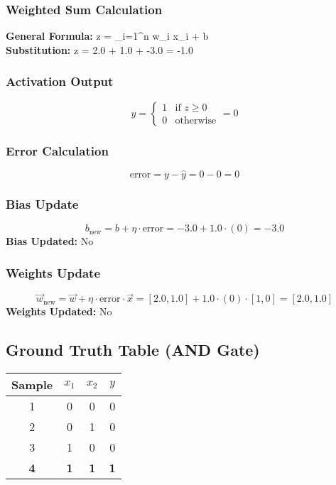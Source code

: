 \documentclass{article}
\begin{document}
\subsubsection*{Weighted Sum Calculation}
\textbf{General Formula:} \quad
z = \sum_{i=1}^{n} w_i x_i + b
\\
\textbf{Substitution:} \quad
z = 2.0  + 1.0  + -3.0 = -1.0

\subsubsection*{Activation Output}
\[
\hat{y} =
\begin{cases}
1 & \text{if } z \geq 0 \\
0 & \text{otherwise}
\end{cases}
= 0
\]

\subsubsection*{Error Calculation}
\[
\text{error} = y - \hat{y} = 0 - 0 = 0
\]

\subsubsection*{Bias Update}
\[
b_{\text{new}} = b + \eta \cdot \text{error} = -3.0 + 1.0 \cdot (0) = -3.0
\]
\textbf{Bias Updated:} No

\subsubsection*{Weights Update}
\[
\vec{w}_{\text{new}} = \vec{w} + \eta \cdot \text{error} \cdot \vec{x} = 
[2.0, 1.0] + 1.0 \cdot (0) \cdot [1, 0] = 
[2.0, 1.0]
\]
\textbf{Weights Updated:} No

\subsection*{Ground Truth Table (AND Gate)}
\begin{center}
\begin{tabular}{|c|c|c|c|}
\hline
\textbf{Sample} & $x_1$ & $x_2$ & $y$ \\
\hline
1 & 0 & 0 & 0 \\
\hline
2 & 0 & 1 & 0 \\
\hline
3 & 1 & 0 & 0 \\
\hline
\rowcolor{yellow} \textbf{4} & \textbf{1} & \textbf{1} & \textbf{1} \\
\hline
\end{tabular}
\end{center}
\end{document}
